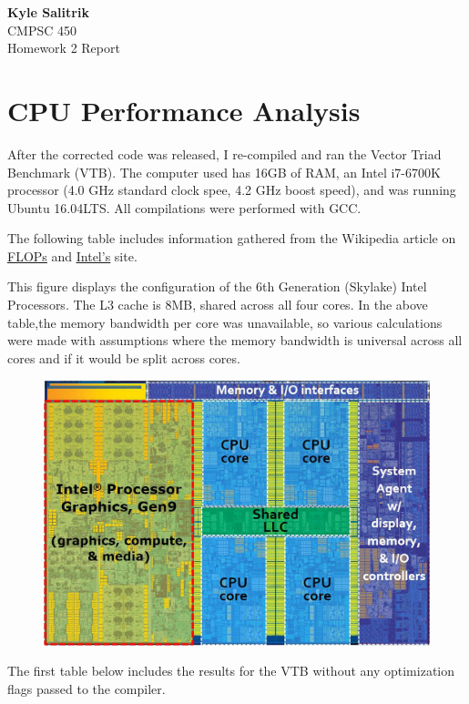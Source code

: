 \documentclass[a4paper, 11pt]{article}
\begin{document}
\graphicspath{{./figures/}}
\noindent
\large\textbf{Kyle Salitrik} \\
\normalsize CMPSC 450\\
\large{Homework 2 Report} \hfill 


\section*{CPU Performance Analysis}
After the corrected code was released, I re-compiled and ran the Vector Triad Benchmark (VTB). The computer used has 16GB of RAM, an Intel i7-6700K processor (4.0 GHz standard clock spee, 4.2 GHz boost speed), and was running Ubuntu 16.04LTS. All compilations were performed with GCC. 

The following table includes information gathered from the Wikipedia article on \href{''https://en.wikipedia.org/wiki/FLOPS''}{\underline{FLOPs}} and \href{''http://ark.intel.com/products/88195/Intel-Core-i7-6700K-Processor-8M-Cache-up-to-4_20-GHz''}{\underline{Intel's}} site.

This figure displays the configuration of the 6th Generation (Skylake) Intel Processors. The L3 cache is 8MB, shared across all four cores. In the above table,the memory bandwidth per core was unavailable, so various calculations were made with assumptions where the memory bandwidth is universal across all cores and if it would be split across cores.
\begin{figure}[H]
	\centering
	\includegraphics[width=5in]{skylake_diagram.png}
\end{figure}
\newpage
The first table below includes the results for the VTB without any optimization flags passed to the compiler.
\end{document}
